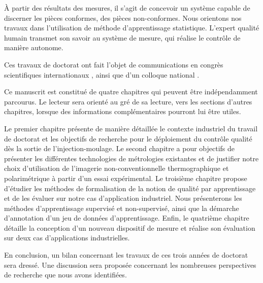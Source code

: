 À partir des résultats des mesures, il s'agit de concevoir un système capable de discerner les pièces conformes, des pièces non-conformes.
Nous orientons nos travaux dans l'utilisation de méthode d'apprentissage statistique.
L'expert qualité humain transmet son savoir au système de mesure, qui réalise le contrôle de manière autonome.

\bigskip

Ces travaux de doctorat ont fait l’objet de communications en congrès scientifiques internationaux \cite{nagorny_towards_2017, nagorny_injection_2017, nagorny_quality_2017, nagorny_generative_2018, nagorny_polarimetric_2019}, ainsi que d'un colloque national \cite{nagorny_towards_2017}.

\bigskip

Ce manuscrit est constitué de quatre chapitres qui peuvent être indépendamment parcourus.
Le lecteur sera orienté au gré de sa lecture, vers les sections d'autres chapitres, lorsque des informations complémentaires pourront lui être utiles.

Le premier chapitre présente de manière détaillée le contexte industriel du travail de doctorat et les objectifs de recherche pour le déploiement du contrôle qualité dès la sortie de l'injection-moulage.  %
Le second chapitre a pour objectifs de présenter les différentes technologies de métrologies existantes et de justifier notre choix d'utilisation de l'imagerie non-conventionnelle thermographique et polarimétrique à partir d'un essai expérimental.  %
Le troisième chapitre propose d'étudier les méthodes de formalisation de la notion de qualité par apprentissage et de les évaluer sur notre cas d'application industriel.
Nous présenterons les méthodes d'apprentissage supervisé et non-supervisé, ainsi que la démarche d'annotation d'un jeu de données d'apprentissage.  %
Enfin, le quatrième chapitre détaille la conception d'un nouveau dispositif de mesure et réalise son évaluation sur deux cas d'applications industrielles.  %

En conclusion, un bilan concernant les travaux de ces trois années de doctorat sera dressé.
Une discussion sera proposée concernant les nombreuses perspectives de recherche que nous avons identifiées.  %
